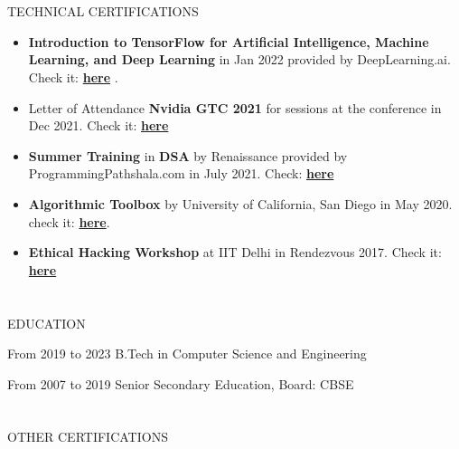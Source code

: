 \documentclass{my_cv}
\begin{document}
\begin{multicols}{2}
\section{\faPaintBrush}{TECHNICAL CERTIFICATIONS}
\begin{itemize}[noitemsep]
    \item \textbf{Introduction to TensorFlow for Artificial Intelligence, Machine Learning, and Deep Learning} in Jan 2022 provided by DeepLearning.ai. Check it: \textbf{\href{https://www.coursera.org/account/accomplishments/certificate/H8WRJYD4T2BQ}{here}} .
    \par
    \item Letter of Attendance\textbf{ Nvidia GTC 2021} for sessions at the conference in Dec 2021.
    Check it: \textbf{\href{https://drive.google.com/file/d/16Tgme1Sr4KLjh2kWmrEXJBxSxgiaxqPo/view}{here}}
    \par
    \item \textbf{Summer Training} in \textbf{DSA} by Renaissance provided by ProgrammingPathshala.com in July 2021. Check: \textbf{\href{https://drive.google.com/file/d/1mEDQhzi45hriBOnNocF9JVuJe5caTsaX/view}{here}}
    \par
    \item \textbf{Algorithmic Toolbox} by University of California, San Diego in May 2020. check it: \textbf{\href{https://www.coursera.org/account/accomplishments/certificate/7TUG86DARH68}{here}}.
    \par
    \item \textbf{Ethical Hacking Workshop} at IIT Delhi in Rendezvous 2017. Check it: \textbf{\href{https://drive.google.com/file/d/1I0uNqQeMgE7rf2xn4YXI0yu-UilRbEui/view}{here}}
\end{itemize}

\section{\faGraduationCap}{EDUCATION}
    
{From 2019 to 2023} %
{B.Tech in Computer Science and Engineering}
    
{From 2007 to 2019} %
{Senior Secondary Education, Board: CBSE }

\section{\faStar}{OTHER CERTIFICATIONS}


\end{multicols}
\end{document}
